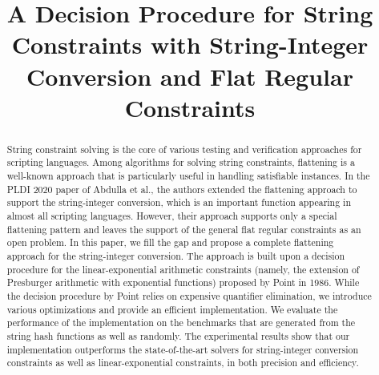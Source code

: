 \documentclass[runningheads]{llncs}
\title{A Decision Procedure for String Constraints with String-Integer Conversion and Flat Regular Constraints}
\author{ }
\institute{ }
\newcommand{\parseInt}{\textsf{parseInt}}
\begin{document}
\maketitle{}

\begin{abstract}
    String constraint solving is the core of various testing and verification approaches for scripting languages. 
    Among algorithms for solving string constraints, flattening is a well-known approach that is particularly useful in handling satisfiable instances.
    In the PLDI 2020 paper of Abdulla et al., the authors extended the flattening approach to support the string-integer conversion, which is an important function appearing in almost all scripting languages.
    However, their approach supports only a special flattening pattern and leaves the support of the general flat regular constraints as an open problem.
    In this paper, we fill the gap and propose a complete flattening approach for the string-integer conversion. The approach is built upon a decision procedure for the linear-exponential arithmetic constraints (namely, the extension of Presburger arithmetic with exponential functions) proposed by Point in 1986. While the decision procedure by Point relies on expensive quantifier elimination, we introduce various optimizations and provide an efficient implementation.
    We evaluate the performance of the implementation on the benchmarks that are generated from the string hash functions as well as randomly.
    The experimental results show that our implementation outperforms the state-of-the-art solvers for string-integer conversion constraints as well as linear-exponential constraints, in both precision and efficiency.

\end{abstract}

\iffalse     
    A Decision Procedure for String Constraints with the {\parseInt} Function and Flat Regular Constraints

    {\parseInt} converts strings to integers and is an important function in string manipulating programs. 
    Solving string constraints with {\parseInt} is challenging and undecidable in general. 
    The state-of-the-art string solvers resort to heuristics to solve such constraints. 
    In this work, we propose a decision procedure for a class of string constraints which 
    are boolean combinations of word equations, flat regular constraints, and {\parseInt} function. 
    The decision procedure is obtained by reducing the satisfiability problem to that of
    an extension of Presburger arithmetic with exponential functions, which is decidable. 
    We implement the decision procedure and carry out experiments to evaluate the performance. 
    The experimental results show the improvement against the state-of-the-art string solvers 
    in both precision and performance. To the best of our knowledge, this work represents the 
    first decision procedure for a class of string constraints with {\parseInt} function.
\fi 
\end{document}
